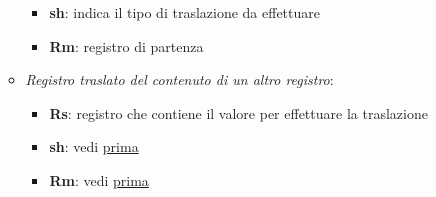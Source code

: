 \begin{itemize}
\begin{itemize}
\begin{itemize}
			\item \textbf{sh}: indica il tipo di traslazione da effettuare \label{it:sh}
			\item \textbf{Rm}: registro di partenza \label{it:rm}
		\end{itemize}
		\item \textit{Registro traslato del contenuto di un altro registro}:
		\begin{itemize}
			\item \textbf{Rs}: registro che contiene il valore per effettuare la traslazione
			\item \textbf{sh}: vedi \hyperref[it:sh]{prima}
			\item \textbf{Rm}: vedi \hyperref[it:rm]{prima}
		\end{itemize}
	\end{itemize}
\end{itemize}

